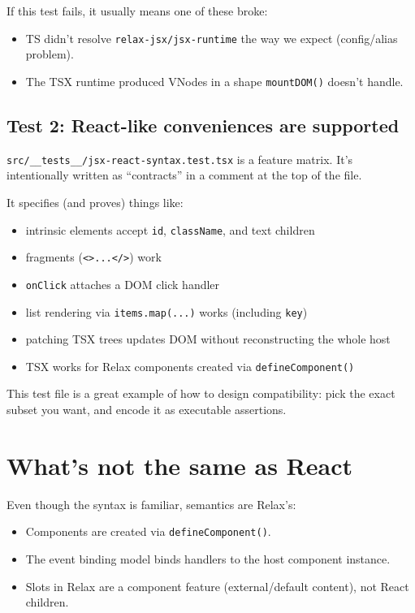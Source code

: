 If this test fails, it usually means one of these broke:

\begin{itemize}
  \item TS didn't resolve \texttt{relax-jsx/jsx-runtime} the way we expect (config/alias problem).
  \item The TSX runtime produced VNodes in a shape \texttt{mountDOM()} doesn't handle.
\end{itemize}

\subsection{Test 2: React-like conveniences are supported}
	\texttt{src/\_\_tests\_\_/jsx-react-syntax.test.tsx} is a feature matrix.
It's intentionally written as ``contracts'' in a comment at the top of the file.

It specifies (and proves) things like:

\begin{itemize}
  \item intrinsic elements accept \texttt{id}, \texttt{className}, and text children
  \item fragments (\texttt{<>...</>}) work
  \item \texttt{onClick} attaches a DOM click handler
  \item list rendering via \texttt{items.map(...)} works (including \texttt{key})
  \item patching TSX trees updates DOM without reconstructing the whole host
  \item TSX works for Relax components created via \texttt{defineComponent()}
\end{itemize}

This test file is a great example of how to design compatibility: pick the exact subset you want, and encode it as executable assertions.

\section{What's not the same as React}
Even though the syntax is familiar, semantics are Relax's:

\begin{itemize}
  \item Components are created via \texttt{defineComponent()}.
  \item The event binding model binds handlers to the host component instance.
  \item Slots in Relax are a component feature (external/default content), not React children.
\end{itemize}

